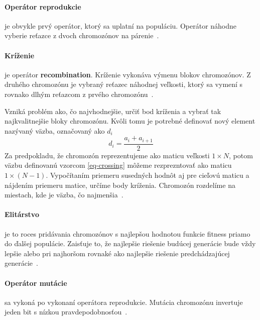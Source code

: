 \documentclass[a4paper,slovak,12pt,appendix]{article}
\begin{document}
\paragraph{Operátor reprodukcie}
je obvykle prvý operátor, ktorý sa uplatní na populáciu. Operátor náhodne
vyberie reťazce z dvoch chromozónov na párenie~\cite{Chavan2015}.

\paragraph{Kríženie}
je operátor \textbf{recombination}. Kríženie vykonáva výmenu blokov chromozónov.
Z druhého chromozónu je vybraný reťazec náhodnej veľkosti, ktorý sa vymení
s rovnako dlhým reťazcom z prvého chromozónu~\cite{Chavan2015}.

Vzniká problém ako, čo najvhodnejšie, určiť bod kríženia a vybrať tak
najkvalitnejšie bloky chromozónu. Kvôli tomu je potrebné definovať nový element
nazývaný väzba, označovaný ako $d_i$
\begin{equation}
  d_i = \frac{a_i + a_{i+1}}{2}
  \label{eq-crossing}
\end{equation}
Za predpokladu, že chromozón reprezentujeme ako maticu veľkosti $1 \times N$,
potom väzbu definovanú vzorcom \ref{eq-crossing} môžeme rezprezntovať ako
maticu $1 \times (N-1)$. Vypočítaním priemeru susedných hodnôt aj pre cieľovú
maticu a nájdením priemeru matice, určíme body kríženia. Chromozón rozdelíme na
miestach, kde je väzba, čo najmenšia~\cite{Simonova2007}.

\paragraph{Elitárstvo}
je to roces pridávania chromozónov s najlepšou hodnotou funkcie fitness priamo
do ďalšej populácie. Zaisťuje to, že najlepšie riešenie budúcej generácie bude
vždy lepšie alebo pri najhoršom rovnaké ako najlepšie riešenie predchádzajúcej
generácie~\cite{Deolekar2016}.

\paragraph{Operátor mutácie}
sa vykoná po vykonaní operátora reprodukcie. Mutácia chromozónu invertuje jeden
bit s nízkou pravdepodobnosťou~\cite{Chavan2015}.
\end{document}
